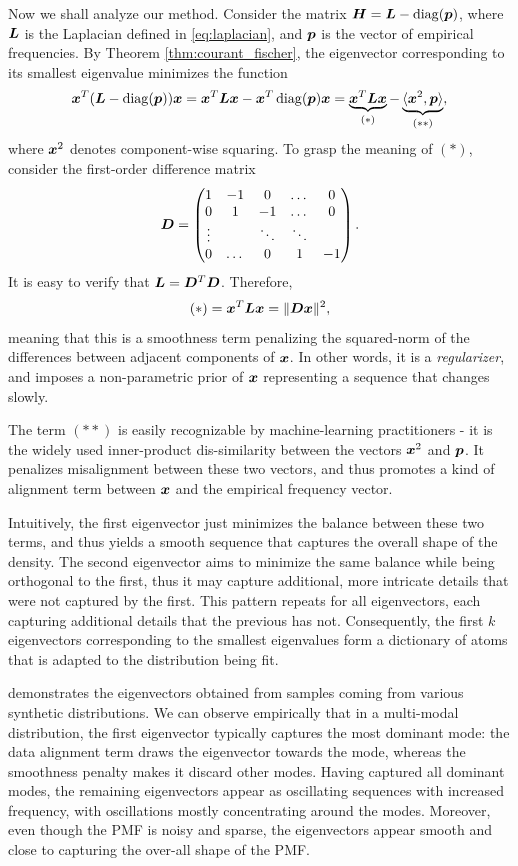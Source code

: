 \documentclass[10pt]{article} %
\DeclareMathOperator{\diag}{diag}
\begin{document}
Now we shall analyze our method. Consider the matrix $\mH = \mL - \diag(\vp)$, where ${\bm{L}}$ is the Laplacian defined in \eqref{eq:laplacian}, and ${\bm{p}}$ is the vector of empirical frequencies. By Theorem \ref{thm:courant_fischer}, the eigenvector corresponding to its smallest eigenvalue minimizes the function
\[
\vx^T (\mL - \diag(\vp)) \vx = \vx^T \mL \vx - \vx^T \diag(\vp) \vx = \underbrace{\vx^T \mL \vx}_{(*)} - \underbrace{\langle \vx^2, \vp \rangle}_{(**)},
\]
where ${\bm{x}}^2$ denotes component-wise squaring. To grasp the meaning of $(*)$, consider the first-order difference matrix
\[
{\bm{D}} = \begin{pmatrix}
    1 & -1 & 0 & \dots & 0 \\
    0 & 1 & -1 & \dots & 0 \\
    \vdots &   & \ddots & \ddots \\
    0 & \dots & 0 & 1 & -1
\end{pmatrix}.
\]
It is easy to verify that ${\bm{L}} = {\bm{D}}^T {\bm{D}}$. Therefore,
\[
(*) = {\bm{x}}^T {\bm{L}} {\bm{x}} = \| {\bm{D}} {\bm{x}} \|^2,
\]
meaning that this is a smoothness term penalizing the squared-norm of the differences between adjacent components of ${\bm{x}}$. In other words, it is a \emph{regularizer}, and imposes a non-parametric prior of ${\bm{x}}$ representing a sequence that changes slowly.

The term $(**)$ is easily recognizable by machine-learning practitioners - it is the widely used inner-product dis-similarity between the vectors ${\bm{x}}^2$ and ${\bm{p}}$. It penalizes misalignment between these two vectors, and thus promotes a kind of alignment term between ${\bm{x}}$ and the empirical frequency vector. 

Intuitively, the first eigenvector just minimizes the balance between these two terms, and thus yields a smooth sequence that captures the overall shape of the density. The second eigenvector aims to minimize the same balance while being orthogonal to the first, thus it may capture additional, more intricate details that were not captured by the first. This pattern repeats for all eigenvectors, each capturing additional details that the previous has not. Consequently, the first $k$ eigenvectors corresponding to the smallest eigenvalues form a dictionary of atoms that is adapted to the distribution being fit.

 demonstrates the eigenvectors obtained from samples coming from various synthetic distributions. We can observe empirically that in a multi-modal distribution, the first eigenvector typically captures the most dominant mode: the data alignment term draws the eigenvector towards the mode, whereas the smoothness penalty makes it discard other modes. Having captured all dominant modes, the remaining eigenvectors appear as oscillating sequences with increased frequency, with oscillations mostly concentrating around the modes. Moreover, even though the PMF is noisy and sparse, the eigenvectors appear smooth and close to capturing the over-all shape of the PMF.
\end{document}
